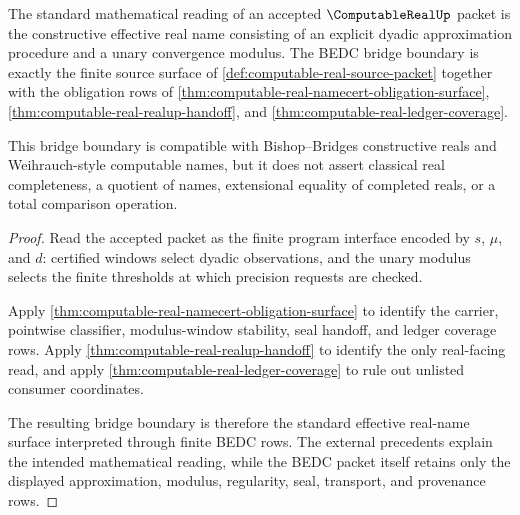 \begin{theorem}
\label{thm:computable-real-standard-bridge-boundary}
The standard mathematical reading of an accepted $\ComputableRealUp$ packet is
the constructive effective real name consisting of an explicit dyadic
approximation procedure and a unary convergence modulus. The BEDC bridge
boundary is exactly the finite source surface of
\autoref{def:computable-real-source-packet} together with the obligation rows
of \autoref{thm:computable-real-namecert-obligation-surface},
\autoref{thm:computable-real-realup-handoff}, and
\autoref{thm:computable-real-ledger-coverage}.

This bridge boundary is compatible with Bishop--Bridges constructive reals and
Weihrauch-style computable names, but it does not assert classical real
completeness, a quotient of names, extensional equality of completed reals, or
a total comparison operation.
\end{theorem}
\begin{proof}
Read the accepted packet as the finite program interface encoded by
$s$, $\mu$, and $d$: certified windows select dyadic observations, and the
unary modulus selects the finite thresholds at which precision requests are
checked.

Apply \autoref{thm:computable-real-namecert-obligation-surface} to identify
the carrier, pointwise classifier, modulus-window stability, seal handoff, and
ledger coverage rows. Apply
\autoref{thm:computable-real-realup-handoff} to identify the only real-facing
read, and apply \autoref{thm:computable-real-ledger-coverage} to rule out
unlisted consumer coordinates.

The resulting bridge boundary is therefore the standard effective real-name
surface interpreted through finite BEDC rows. The external precedents explain
the intended mathematical reading, while the BEDC packet itself retains only
the displayed approximation, modulus, regularity, seal, transport, and
provenance rows.
\end{proof}

